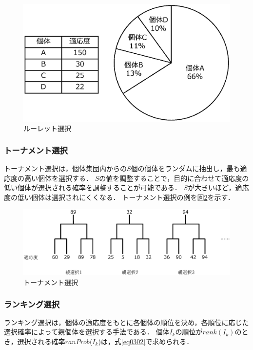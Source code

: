 \begin{figure}[t]
    \begin{center}
    \includegraphics[scale=0.5]{image/ga_roulette.eps}
    \caption{ルーレット選択}
    \label{ga_roulette}
    \end{center}
\end{figure}



\subsubsection{トーナメント選択}
トーナメント選択は，個体集団内からの$S$個の個体をランダムに抽出し，最も適応度の高い個体を選択する．
$S$の値を調整することで，目的に合わせて適応度の低い個体が選択される確率を調整することが可能である．
$S$が大きいほど，適応度の低い個体は選択されにくくなる．
トーナメント選択の例を図\ref{ga_tournament}を示す．

\begin{figure}[b!]
    \begin{center}
    \includegraphics[scale=0.55]{image/ga_tournament.eps}
    \caption{トーナメント選択}
    \label{ga_tournament}
    \end{center}
\end{figure}

\subsubsection{ランキング選択}
ランキング選択は，個体の適応度をもとに各個体の順位を決め，各順位に応じた選択確率によって親個体を選択する手法である．
個体$I_k$の順位が${rank(I_k)}$のとき，選択される確率$ranProb$(${I_k}$)は，式\ref{eq0302}で求められる．

